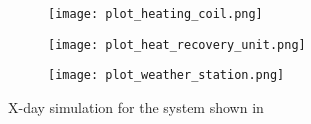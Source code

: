 \begin{figure*}
     \begin{subfigure}{0.45\linewidth}
         \centering
         \texttt{[image: plot\_heating\_coil.png]}
         \vspace*{\distanceToCaption mm}
         \caption{}
         \label{fig:}
     \end{subfigure}
     \begin{subfigure}{0.45\linewidth}
         \centering
         \texttt{[image: plot\_heat\_recovery\_unit.png]}
         \vspace*{\distanceToCaption mm}
         \caption{}
         \label{fig:}
     \end{subfigure}
     
     \begin{subfigure}{0.45\linewidth}
         \centering
         \texttt{[image: plot\_weather\_station.png]}
         \vspace*{\distanceToCaption mm}
         \caption{}
         \label{fig:}
     \end{subfigure}
        \caption{X-day simulation for the system shown in}
        \label{fig:three graphs}
\end{figure*}







